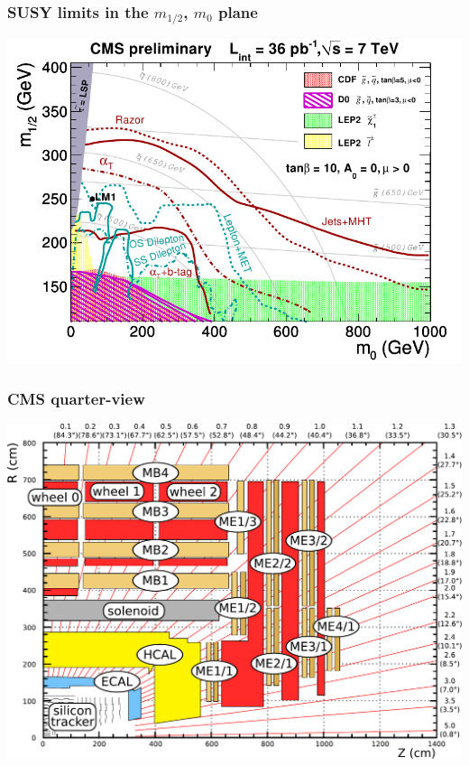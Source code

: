 \documentclass[compress]{beamer}
\begin{document}
\begin{frame}
\frametitle{SUSY limits in the $m_{1/2}$, $m_0$ plane}
\includegraphics[width=\linewidth]{figures/explicit_models.png}
\end{frame}

\begin{frame}
\frametitle{CMS quarter-view}
\includegraphics[width=\linewidth]{muon_system_labeled2.pdf}
\end{frame}
\end{document}
